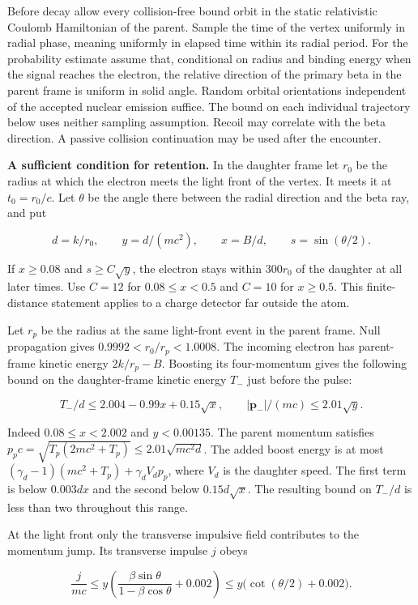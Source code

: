 \documentclass[11pt,a4paper]{article}
\begin{document}
Before decay allow every collision-free bound orbit in the static
relativistic Coulomb Hamiltonian of the parent. Sample the time of the
vertex uniformly in radial phase, meaning uniformly in elapsed time
within its radial period. For the probability estimate assume that,
conditional on radius and binding energy when the signal reaches the
electron, the relative direction of the primary beta in the parent frame
is uniform in solid angle. Random orbital orientations independent of
the accepted nuclear emission suffice. The bound on each individual
trajectory below uses neither sampling assumption. Recoil may correlate
with the beta direction. A passive collision continuation may be used
after the encounter.

\textbf{A sufficient condition for retention.} In the daughter frame let
\(r_0\) be the radius at which the electron meets the light front of the
vertex. It meets it at \(t_0=r_0/c\). Let \(\theta\) be the angle there
between the radial direction and the beta ray, and put

\[
 d=k/r_0,\qquad y=d/(mc^2),\qquad x=B/d,\qquad s=\sin(\theta/2).
\]

If \(x\ge0.08\) and \(s\ge C\sqrt y\), the electron stays within
\(300r_0\) of the daughter at all later times. Use \(C=12\) for
\(0.08\le x<0.5\) and \(C=10\) for \(x\ge0.5\). This finite-distance
statement applies to a charge detector far outside the atom.

Let \(r_p\) be the radius at the same light-front event in the parent
frame. Null propagation gives \(0.9992<r_0/r_p<1.0008\). The incoming
electron has parent-frame kinetic energy \(2k/r_p-B\). Boosting its
four-momentum gives the following bound on the daughter-frame kinetic
energy \(T_-\) just before the pulse:

\[
        T_-/d \le 2.004-0.99x+0.15\sqrt{x},\qquad
        |\boldsymbol p_-|/(mc)\le 2.01\sqrt y .
\]

Indeed \(0.08\le x<2.002\) and \(y<0.00135\). The parent momentum
satisfies \(p_pc=\sqrt{T_p(2mc^2+T_p)}\le2.01\sqrt{mc^2d}\). The added
boost energy is at most \((\gamma_d-1)(mc^2+T_p)+\gamma_d V_d p_p\),
where \(V_d\) is the daughter speed. The first term is below
\(0.003d x\) and the second below \(0.15d\sqrt{x}\). The resulting bound
on \(T_-/d\) is less than two throughout this range.

At the light front only the transverse impulsive field contributes to
the momentum jump. Its transverse impulse \(j\) obeys

\[
 \frac{j}{mc}\le y\left(\frac{\beta\sin\theta}{1-\beta\cos\theta}
                   +0.002\right)
       \le y\big(\cot(\theta/2)+0.002\big).
\]
\end{document}
